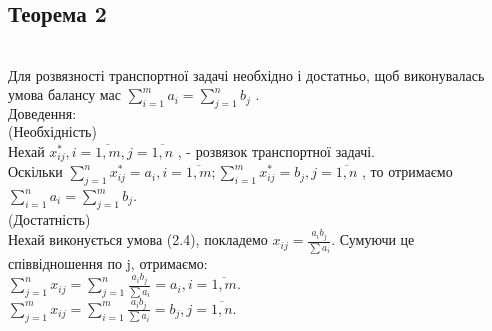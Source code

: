 \documentclass[12pt]{book}
\begin{document}
\subsection{Теорема  2}\\
Для розвязності транспортної задачі необхідно і достатньо, щоб виконувалась умова балансу мас $\sum_{i=1}^m a_i = \sum_{j=1}^n b_j$ .
\\
$\mathbf {Доведення:}$\\
(Необхідність)\\ 
 Нехай $ x_{ij}^*, i = \overline{1, m}, j = \overline{1, n}$ , - розвязок транспортної задачі. \\
 Оскільки  $\sum_{j=1}^n x_{ij}^* = a_i,  i = \overline{1, m};  \sum_{i=1}^m  x_{ij}^* = b_j ,  j = \overline{1, n}$ , то отримаємо
 $\sum_{i=1}^n a_i = \sum_{j=1}^m b_j$.
\\
(Достатність)
\\
Нехай виконується умова (2.4), покладемо  $x_{ij} = \frac{a_ib_j}{\sum a_i}$. Сумуючи це співвідношення по j, отримаємо:\\
$\sum_{j=1}^n x_{ij} = \sum_{j=1}^n \frac{a_ib_j}{\sum a_i} = a_i,  i = \overline{1, m}.$
\\ $\sum_{j=1}^m x_{ij} = \sum_{i=1}^m \frac{a_ib_j}{\sum a_i} = b_j,  j = \overline{1, n}.$
\\
\end{document}
